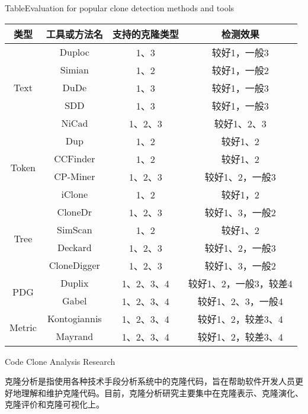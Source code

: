 \begin{table}[htbp]
{Table$\!$}{Evaluation for popular clone detection methods and tools}
\vspace{0.5em}
\centering
\wuhao
\begin{tabular}{cccc}
\toprule[1.5pt]
类型&工具或方法名&支持的克隆类型&检测效果\\
\midrule[1pt]
\multirow{5}{*}{Text} 
& Duploc\cite{ducasse1999language}&1、3&较好1，一般3\\
&Simian&1、2	&较好1，一般2\\
&DuDe\cite{wettel2005archeology}&1、3	&较好1，一般3\\
&SDD\cite{lee2005sdd}&1、3	&较好1，一般3\\
&NiCad\cite{roy2008nicad}&	1、2、3	&较好1、2、3\\
\hline
\multirow{4}{*}{Token} 
&Dup\cite{baker1995finding}&	1、2&较好1、2\\
&CCFinder\cite{kamiya2002ccfinder}&1、2&较好1、2\\
&CP-Miner\cite{li2006cp}&1、2、3&较好1、2，一般3\\
&iClone\cite{gode2009incremental}&1、2	&较好1，2\\
\hline
\multirow{4}{*}{Tree} 
&CloneDr\cite{baxter1998clone}&	1、2、3	&较好1、3，一般2\\
&SimScan&	1、2	&较好1、2\\
&Deckard\cite{jiang2007deckard}&	1、2、3	&较好1、2，一般3\\
&CloneDigger\cite{bulychev2008duplicate}&	1、2、3	&较好1、3，一般2\\
\hline
\multirow{2}{*}{PDG} 
&Duplix\cite{krinke2001identifying}&	1、2、3、4	&较好1、2，一般3，较差4\\
&Gabel\cite{gabel2008scalable}&1、2、3、4	&较好1、2、3，一般4\\
\hline
\multirow{2}{*}{Metric} 
&Kontogiannis\cite{kontogiannis1996pattern}&	1、2、3、4	&较好1、2，较差3、4\\
&Mayrand\cite{mayrand1996experiment}&	1、2、3、4	&较好1、2，较差3、4\\
\bottomrule[1.5pt]
\end{tabular}
\end{table}

{Code Clone Analysis Research}

克隆分析是指使用各种技术手段分析系统中的克隆代码，旨在帮助软件开发人员更好地理解和维护克隆代码。目前，克隆分析研究主要集中在克隆表示、克隆演化、克隆评价和克隆可视化上。

